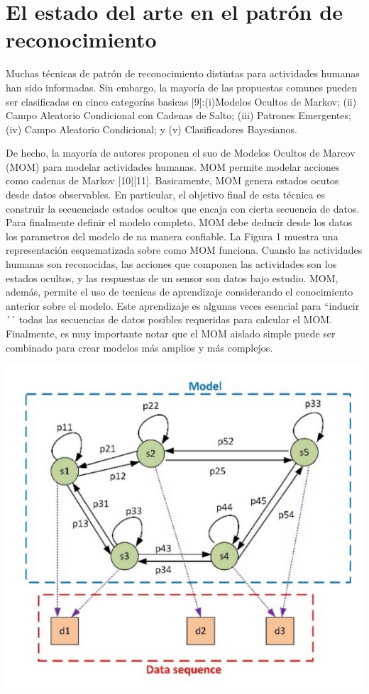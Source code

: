 \documentclass[a4paper]{article}
\begin{document}
\section{El estado del arte en el patrón de reconocimiento}
Muchas técnicas de patrón de reconocimiento distintas para actividades humanas han sido informadas. Sin embargo, la mayoría de las propuestas comunes pueden ser clasificadas en cinco categorías basicas [9]:(i)Modelos Ocultos de Markov; (ii) Campo Aleatorio Condicional con Cadenas de Salto; (iii) Patrones Emergentes; (iv) Campo Aleatorio Condicional; y (v) Clasificadores Bayesianos.
\begin{center}De hecho, la mayoría de autores proponen el suo de Modelos Ocultos de Marcov (MOM) para modelar actividades humanas. MOM permite modelar acciones como cadenas de Markov [10][11]. Basicamente, MOM genera estados ocutos desde datos observables. En particular, el objetivo final de esta técnica es construir la secuenciade estados ocultos que encaja con cierta secuencia de datos. Para finalmente definir el modelo completo, MOM debe deducir desde los datos los parametros del modelo de na manera confiable. La Figura 1 muestra una representación esquematizada
sobre como MOM funciona. Cuando las actividades humanas son reconocidas, las acciones que componen las actividades son los estados ocultos, y las respuestas de un sensor son datos bajo estudio. MOM, además, permite el uso de tecnicas de aprendizaje considerando el conocimiento anterior sobre el modelo. Este aprendizaje es algunas veces esencial para ``inducir´´ todas las secuencias de datos posibles requeridas para calcular el MOM. Finalmente, es muy importante notar que el MOM aislado simple puede ser combinado para crear modelos más amplios y más complejos. 
\end{center}
\center\includegraphics[scale=1,bb=0 0 30 30]{Fig_1} 
\end{document}
